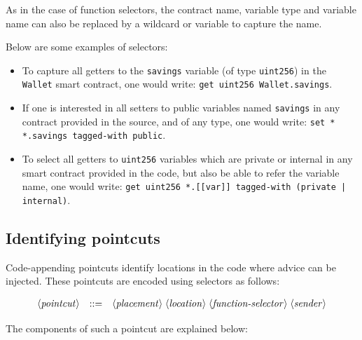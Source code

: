 \documentclass{article}
\newcommand{\variable}[1]{\ensuremath{\langle\textrm{\textit{#1}}\rangle}}
\begin{document}
As in the case of function selectors, the contract name, variable type and variable name can also be replaced by a wildcard or variable to capture the name. 

Below are some examples of selectors: 

\begin{itemize}
\item To capture all getters to the \texttt{savings} variable (of type \texttt{uint256}) in the \texttt{Wallet} smart contract, one would write: \texttt{get uint256 Wallet.savings}.
\item If one is interested in all setters to public variables named \texttt{savings} in any contract provided in the source, and of any type, one would write: \texttt{set * *.savings tagged-with public}.
\item To select all getters to \texttt{uint256} variables which are private or internal in any smart contract provided in the code, but also be able to refer the variable name, one would write:
\texttt{get uint256 *.[[var]] tagged-with (private | internal)}.
\end{itemize}



\subsection{Identifying pointcuts}
\label{s:pointcuts}

Code-appending pointcuts identify locations in the code where advice can be injected. These pointcuts are encoded using selectors as follows:

\[\begin{array}{lcl}
\variable{pointcut} & ::= &
\variable{placement}\; \variable{location}\; \variable{function-selector}\; \variable{sender}
\end{array}\]

\noindent The components of such a pointcut are explained below:
\end{document}
